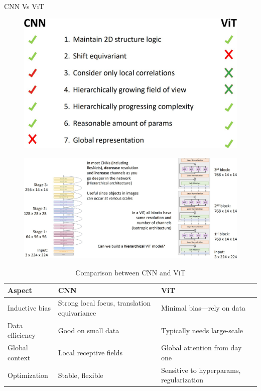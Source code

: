 \begin{frame}[allowframebreaks]{CNN Vs ViT}
    \begin{figure}
        \centering
        \includegraphics[width=\linewidth,height=0.9\textheight,keepaspectratio]{images/vit/slide_67_1_img.jpg}
    \end{figure}

    \framebreak

    \begin{figure}
        \centering
        \includegraphics[width=\linewidth,height=0.9\textheight,keepaspectratio]{images/vit/slide_68_1_img.jpg}
    \end{figure}

    \framebreak

    \begin{table}[h!]
        \centering
        \begin{tabular}{|l|p{4cm}|p{4cm}|}
            \hline
            \textbf{Aspect} & \textbf{CNN} & \textbf{ViT} \\
            \hline
            Inductive bias & Strong local focus, translation equivariance & Minimal bias—rely on data \\
            \hline
            Data efficiency & Good on small data & Typically needs large-scale \\
            \hline
            Global context & Local receptive fields & Global attention from day one \\
            \hline
            Optimization & Stable, flexible & Sensitive to hyperparams, regularization \\
            \hline
        \end{tabular}
        \caption{Comparison between CNN and ViT}
    \end{table}
\end{frame}